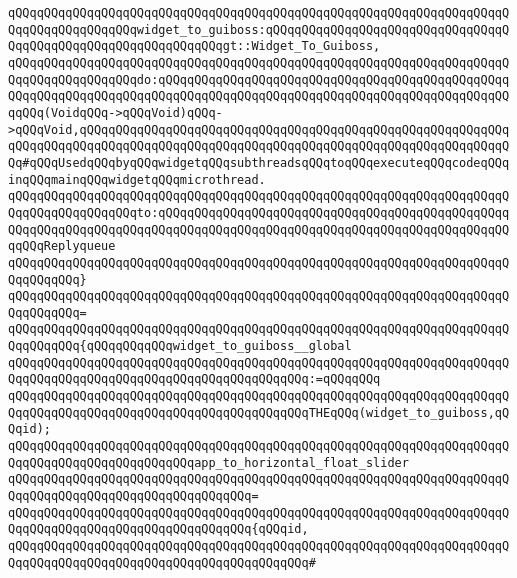 \verb|qQQqqQQqqQQqqQQqqQQqqQQqqQQqqQQqqQQqqQQqqQQqqQQqqQQqqQQqqQQqqQQqqQQqqQQqqQQqqQQqqQQqqQQqwidget_to_guiboss:qQQqqQQqqQQqqQQqqQQqqQQqqQQqqQQqqQQqqQQqqQQqqQQqqQQqqQQqqQQqqQQqgt::Widget_To_Guiboss,|\newline
\verb|qQQqqQQqqQQqqQQqqQQqqQQqqQQqqQQqqQQqqQQqqQQqqQQqqQQqqQQqqQQqqQQqqQQqqQQqqQQqqQQqqQQqqQQqdo:qQQqqQQqqQQqqQQqqQQqqQQqqQQqqQQqqQQqqQQqqQQqqQQqqQQqqQQqqQQqqQQqqQQqqQQqqQQqqQQqqQQqqQQqqQQqqQQqqQQqqQQqqQQqqQQqqQQqqQQqqQQq(VoidqQQq->qQQqVoid)qQQq->qQQqVoid,qQQqqQQqqQQqqQQqqQQqqQQqqQQqqQQqqQQqqQQqqQQqqQQqqQQqqQQqqQQqqQQqqQQqqQQqqQQqqQQqqQQqqQQqqQQqqQQqqQQqqQQqqQQqqQQqqQQqqQQqqQQqqQQqqQQq#qQQqUsedqQQqbyqQQqwidgetqQQqsubthreadsqQQqtoqQQqexecuteqQQqcodeqQQqinqQQqmainqQQqwidgetqQQqmicrothread.|\newline
\verb|qQQqqQQqqQQqqQQqqQQqqQQqqQQqqQQqqQQqqQQqqQQqqQQqqQQqqQQqqQQqqQQqqQQqqQQqqQQqqQQqqQQqqQQqto:qQQqqQQqqQQqqQQqqQQqqQQqqQQqqQQqqQQqqQQqqQQqqQQqqQQqqQQqqQQqqQQqqQQqqQQqqQQqqQQqqQQqqQQqqQQqqQQqqQQqqQQqqQQqqQQqqQQqqQQqqQQqReplyqueue|\newline
\verb|qQQqqQQqqQQqqQQqqQQqqQQqqQQqqQQqqQQqqQQqqQQqqQQqqQQqqQQqqQQqqQQqqQQqqQQqqQQqqQQq}|\newline
\verb|qQQqqQQqqQQqqQQqqQQqqQQqqQQqqQQqqQQqqQQqqQQqqQQqqQQqqQQqqQQqqQQqqQQqqQQqqQQqqQQq=|\newline
\verb|qQQqqQQqqQQqqQQqqQQqqQQqqQQqqQQqqQQqqQQqqQQqqQQqqQQqqQQqqQQqqQQqqQQqqQQqqQQqqQQq{qQQqqQQqqQQqwidget_to_guiboss__global|\newline
\verb|qQQqqQQqqQQqqQQqqQQqqQQqqQQqqQQqqQQqqQQqqQQqqQQqqQQqqQQqqQQqqQQqqQQqqQQqqQQqqQQqqQQqqQQqqQQqqQQqqQQqqQQqqQQqqQQq:=qQQqqQQq|\newline
\verb|qQQqqQQqqQQqqQQqqQQqqQQqqQQqqQQqqQQqqQQqqQQqqQQqqQQqqQQqqQQqqQQqqQQqqQQqqQQqqQQqqQQqqQQqqQQqqQQqqQQqqQQqqQQqqQQqTHEqQQq(widget_to_guiboss,qQQqid);|\newline
\newline
\verb|qQQqqQQqqQQqqQQqqQQqqQQqqQQqqQQqqQQqqQQqqQQqqQQqqQQqqQQqqQQqqQQqqQQqqQQqqQQqqQQqqQQqqQQqqQQqqQQqapp_to_horizontal_float_slider|\newline
\verb|qQQqqQQqqQQqqQQqqQQqqQQqqQQqqQQqqQQqqQQqqQQqqQQqqQQqqQQqqQQqqQQqqQQqqQQqqQQqqQQqqQQqqQQqqQQqqQQqqQQqqQQq=|\newline
\verb|qQQqqQQqqQQqqQQqqQQqqQQqqQQqqQQqqQQqqQQqqQQqqQQqqQQqqQQqqQQqqQQqqQQqqQQqqQQqqQQqqQQqqQQqqQQqqQQqqQQqqQQq{qQQqid,|\newline
\verb|qQQqqQQqqQQqqQQqqQQqqQQqqQQqqQQqqQQqqQQqqQQqqQQqqQQqqQQqqQQqqQQqqQQqqQQqqQQqqQQqqQQqqQQqqQQqqQQqqQQqqQQqqQQqqQQq#|\newline
